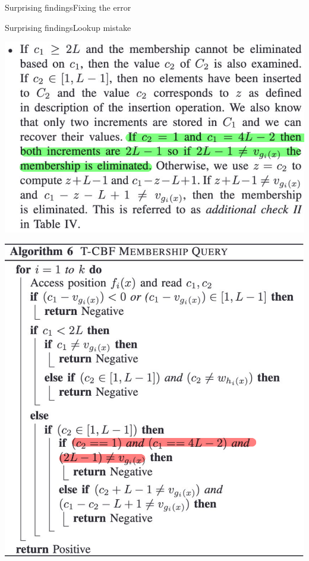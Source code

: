 \documentclass[
  english,            %
  aspectratio=169,    %
]{tumbeamer}
\begin{document}
\begin{frame}{Surprising findings}{Fixing the error}
\begin{minipage}{0.38\textwidth}
  \end{minipage}
\end{frame}

\begin{frame}{Surprising findings}{Lookup mistake}
  \begin{minipage}{0.5\textwidth}
    \includegraphics[width=\linewidth]{img/tbf_lookup_text_mark.pdf}
  \end{minipage}
  \begin{minipage}{0.35\textwidth}
    \includegraphics[width=\linewidth]{img/tbf_lookup_pseudo_mark.pdf}
  \end{minipage}
\end{frame}
\end{document}
